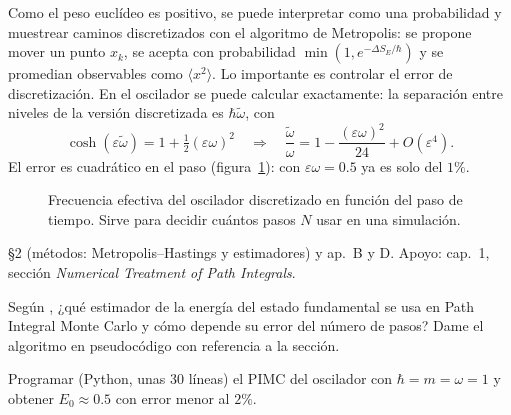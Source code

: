 Como el peso euclídeo es positivo, se puede interpretar como una probabilidad y muestrear caminos discretizados con el algoritmo de Metropolis: se propone mover un punto $x_k$, se acepta con probabilidad $\min(1,e^{-\Delta S_E/\hbar})$ y se promedian observables como $\langle x^2\rangle$. Lo importante es controlar el error de discretización. En el oscilador se puede calcular exactamente: la separación entre niveles de la versión discretizada es $\hbar\tilde\omega$, con
\[
\cosh(\varepsilon\tilde\omega)=1+\tfrac12(\varepsilon\omega)^2\quad\Longrightarrow\quad
\frac{\tilde\omega}{\omega}=1-\frac{(\varepsilon\omega)^2}{24}+O(\varepsilon^4).
\]
El error es cuadrático en el paso (figura~\ref{fig:discret}): con $\varepsilon\omega=0.5$ ya es solo del $1\%$.

\begin{figure}[h]
\centering
{}
\caption{Frecuencia efectiva del oscilador discretizado en función del paso de tiempo. Sirve para decidir cuántos pasos $N$ usar en una simulación.}
\label{fig:discret}
\end{figure}

 \S2 (métodos: Metropolis--Hastings y estimadores) y ap.~B y D. Apoyo:  cap.~1, sección \textit{Numerical Treatment of Path Integrals}.

\begin{prompt}
Según , ¿qué estimador de la energía del estado fundamental se usa en Path Integral Monte Carlo y cómo depende su error del número de pasos? Dame el algoritmo en pseudocódigo con referencia a la sección.
\end{prompt}

Programar (Python, unas 30 líneas) el PIMC del oscilador con $\hbar=m=\omega=1$ y obtener $E_0\approx0.5$ con error menor al $2\%$.

